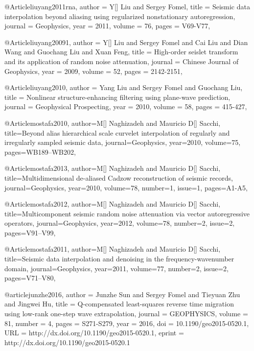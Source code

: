 @Article{liuyang2011rna,
  author = 	 {Y[] Liu and Sergey Fomel},
  title = 	 {Seismic data interpolation beyond aliasing using regularized nonstationary autoregression},
  journal = 	 {Geophysics},
  year = 	 2011,
  volume =	 76,
  pages =	 {V69-V77},
}

@Article{liuyang20091,
  author = 	 {Y[] Liu and Sergey Fomel and Cai Liu and Dian Wang and Guochang Liu and Xuan Feng},
  title = 	 {High-order seislet transform and its application of random noise attenuation},
  journal = 	 {Chinese Journal of Geophysics},
  year = 	 2009,
  volume =	 52,
  pages =	 {2142-2151},
}

@Article{liuyang2010,
  author = 	 {Yang Liu and Sergey Fomel and Guochang Liu},
  title = 	 {Nonlinear structure-enhancing filtering using plane-wave prediction},
  journal = 	 {Geophysical Prospecting},
  year = 	 2010,
  volume =	 58,
  pages =	 {415-427},
}

@Article{mostafa2010,
  author={M[] Naghizadeh and Mauricio D[] Sacchi},
  title={Beyond alias hierarchical scale curvelet interpolation of regularly and irregularly sampled seismic data},
  journal={Geophysics},
  year=2010,
  volume=75,
  pages={WB189–WB202},
}

@Article{mostafa2013,
  author={M[] Naghizadeh and Mauricio D[] Sacchi},
  title={Multidimensional de-aliased Cadzow reconstruction of seismic records},
  journal={Geophysics},
  year=2010,
  volume=78,
  number=1,
  issue=1,
  pages={A1-A5},
}



@Article{mostafa2012,
  author={M[] Naghizadeh and Mauricio D[] Sacchi},
  title={Multicomponent seismic random noise attenuation via vector autoregressive operators},
  journal={Geophysics},
  year=2012,
  volume=78,
  number=2,
  issue=2,
  pages={V91–V99},
}

@Article{mostafa2011,
  author={M[] Naghizadeh and Mauricio D[] Sacchi},
  title={Seismic data interpolation and denoising in the frequency-wavenumber domain},
  journal={Geophysics},
  year=2011,
  volume=77,
  number=2,
  issue=2,
  pages={V71–V80},
}




@article{junzhe2016,
author = {Junzhe Sun and Sergey Fomel and Tieyuan Zhu and Jingwei Hu},
title = {Q-compensated least-squares reverse time migration using low-rank one-step wave extrapolation},
journal = {GEOPHYSICS},
volume = {81},
number = {4},
pages = {S271-S279},
year = {2016},
doi = {10.1190/geo2015-0520.1},
URL = {http://dx.doi.org/10.1190/geo2015-0520.1},
eprint = {http://dx.doi.org/10.1190/geo2015-0520.1}
}


